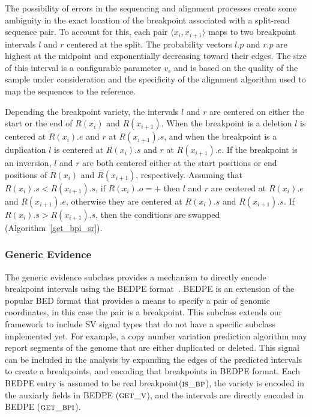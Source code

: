 \documentclass[11pt]{article}
\begin{document}
The possibility of errors in the sequencing and alignment processes create some
ambiguity in the exact location of the breakpoint associated with a split-read
sequence pair.  To account for this, each pair $\langle x_i, x_{i+1} \rangle$
maps to two breakpoint intervals $l$ and $r$ centered at the split. The 
probability vectors $l.p$ and $r.p$ are highest at the midpoint and
exponentially decreasing toward their edges.  The size of this interval is a
configurable parameter $v_s$ and is based on the quality of the sample under
consideration and the specificity of the alignment algorithm used to map the
sequences to the reference.

Depending the breakpoint variety, the intervals $l$ and $r$ are centered on
either the start or the end of $R(x_i)$ and $R(x_{i+1})$.  When the breakpoint
is a deletion $l$ is centered at $R(x_i).e$ and $r$ at $R(x_{i+1}).s$, and when
the breakpoint is a duplication $l$ is centered at $R(x_i).s$ and $r$ at
$R(x_{i+1}).e$.  If the breakpoint is an inversion, $l$ and $r$ are both 
centered either at the start positions or end positions of $R(x_i)$ and
$R(x_{i+1})$, respectively.  Assuming that $R(x_i).s<R(x_{i+1}).s$, if
$R(x_i).o=+$ then $l$ and $r$ are centered at $R(x_i).e$ and  $R(x_{i+1}).e$,
otherwise they are centered at $R(x_i).s$ and  $R(x_{i+1}).s$.  If
$R(x_i).s>R(x_{i+1}).s$, then the conditions are swapped
(Algorithm~\ref{get_bpi_sr}).




\subsubsection{Generic Evidence}

The generic evidence subclass provides a mechanism to directly encode breakpoint
intervals using the BEDPE format~\cite{quinlan2010a}.  BEDPE is an extension of
the popular BED format that provides a means to specify a pair of genomic
coordinates, in this case the pair is a breakpoint.  This subclass extends our
framework to include SV signal types that do not have a specific subclass
implemented yet.  For example, a copy number variation prediction algorithm may
report segments of the genome that are either duplicated or deleted.  This
signal can be included in the analysis by expanding the edges of the predicted
intervals to create a breakpoints, and encoding that breakpoints in BEDPE format.
Each BEDPE entry is assumed to be real breakpoint($\textsc{is\_bp}$), the
variety is encoded in the auxiarly fields in BEDPE ($\textsc{get\_v}$), and the
intervals are directly encoded in BEDPE ($\textsc{get\_bpi}$).
\end{document}

